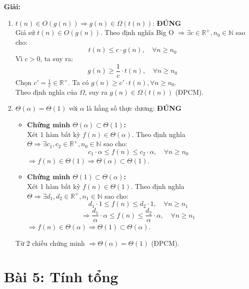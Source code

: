\documentclass[12pt,a4paper]{article}
\begin{document}
\textbf{Giải:}
\begin{enumerate}
    \item[a.] $t(n) \in O(g(n)) \Rightarrow g(n) \in \Omega(t(n))$: \textbf{ĐÚNG} \\
    Giả sử $t(n) \in O(g(n))$. Theo định nghĩa Big O $\Rightarrow \exists c \in \mathbb{R}^+, n_0 \in \mathbb{N}$ sao cho:
    $$t(n) \le c \cdot g(n), \quad \forall n \ge n_0$$
    Vì $c > 0$, ta suy ra:
    $$g(n) \ge \frac{1}{c} \cdot t(n), \quad \forall n \ge n_0$$
    Chọn $c' = \frac{1}{c} \in \mathbb{R}^+$. Ta có $g(n) \ge c' \cdot t(n), \forall n \ge n_0$. \\
    Theo định nghĩa của $\Omega$, suy ra $g(n) \in \Omega(t(n))$ (ĐPCM).
    
    \item[b.] $\Theta(\alpha) = \Theta(1)$ với $\alpha$ là hằng số thực dương: \textbf{ĐÚNG}
    \begin{itemize}
        \item \textbf{Chứng minh $\Theta(\alpha) \subset \Theta(1)$:} \\
        Xét 1 hàm bất kỳ $f(n) \in \Theta(\alpha)$. Theo định nghĩa $\Theta \Rightarrow \exists c_1, c_2 \in \mathbb{R}^+, n_0 \in \mathbb{N}$ sao cho:
        $$c_1 \cdot \alpha \le f(n) \le c_2 \cdot \alpha, \quad \forall n \ge n_0$$
        $\Rightarrow f(n) \in \Theta(1) \Rightarrow \Theta(\alpha) \subset \Theta(1)$.
        
        \item \textbf{Chứng minh $\Theta(1) \subset \Theta(\alpha)$:} \\
        Xét 1 hàm bất kỳ $f(n) \in \Theta(1)$. Theo định nghĩa $\Theta \Rightarrow \exists d_1, d_2 \in \mathbb{R}^+, n_1 \in \mathbb{N}$ sao cho:
        $$d_1 \cdot 1 \le f(n) \le d_2 \cdot 1, \quad \forall n \ge n_1$$
        $$\Rightarrow \frac{d_1}{\alpha} \cdot \alpha \le f(n) \le \frac{d_2}{\alpha} \cdot \alpha, \quad \forall n \ge n_1$$
        $\Rightarrow f(n) \in \Theta(\alpha) \Rightarrow \Theta(1) \subset \Theta(\alpha)$.
    \end{itemize}
    Từ 2 chiều chứng minh $\Rightarrow \Theta(\alpha) = \Theta(1)$ (ĐPCM).
    

\end{enumerate}




\section*{Bài 5: Tính tổng}
\end{document}
